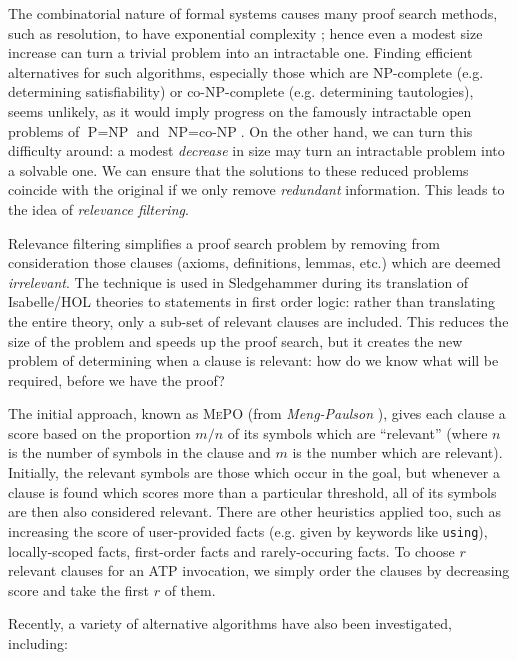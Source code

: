 \documentclass[]{article}
\begin{document}
\cite{kuhlwein2012overview}

The combinatorial nature of formal systems causes many proof search methods, such as resolution, to have exponential complexity \cite{haken1985intractability}; hence even a modest size increase can turn a trivial problem into an intractable one. Finding efficient alternatives for such algorithms, especially those which are NP-complete (e.g. determining satisfiability) or co-NP-complete (e.g. determining tautologies), seems unlikely, as it would imply progress on the famously intractable open problems of $\text{P} = \text{NP}$ and $\text{NP} = \text{co-NP}$. On the other hand, we can turn this difficulty around: a modest \emph{decrease} in size may turn an intractable problem into a solvable one. We can ensure that the solutions to these reduced problems coincide with the original if we only remove \emph{redundant} information. This leads to the idea of \emph{relevance filtering}.

Relevance filtering simplifies a proof search problem by removing from consideration those clauses (axioms, definitions, lemmas, etc.) which are deemed \emph{irrelevant}. The technique is used in Sledgehammer during its translation of Isabelle/HOL theories to statements in first order logic: rather than translating the entire theory, only a sub-set of relevant clauses are included. This reduces the size of the problem and speeds up the proof search, but it creates the new problem of determining when a clause is relevant: how do we know what will be required, before we have the proof?

The initial approach, known as \textsc{MePO} (from \emph{Meng-Paulson} \cite{meng2009lightweight}), gives each clause a score based on the proportion $m / n$ of its symbols which are ``relevant'' (where $n$ is the number of symbols in the clause and $m$ is the number which are relevant). Initially, the relevant symbols are those which occur in the goal, but whenever a clause is found which scores more than a particular threshold, all of its symbols are then also considered relevant. There are other heuristics applied too, such as increasing the score of user-provided facts (e.g. given by keywords like \texttt{using}), locally-scoped facts, first-order facts and rarely-occuring facts. To choose $r$ relevant clauses for an ATP invocation, we simply order the clauses by decreasing score and take the first $r$ of them.

Recently, a variety of alternative algorithms have also been investigated, including:
\end{document}
